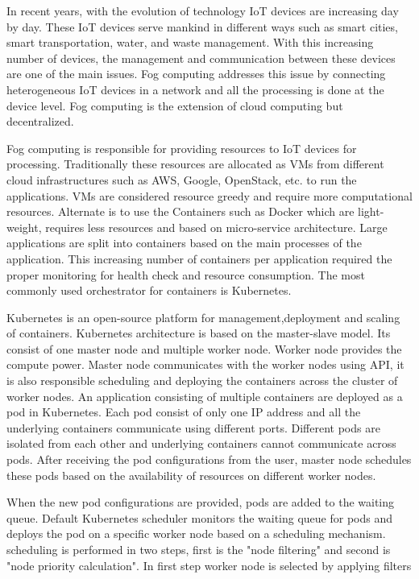 \documentclass[12pt,twoside,doublepage]{article}
\begin{document}
In recent years, with the evolution of technology IoT devices are increasing day
by day. These IoT devices serve mankind in different ways such as smart cities,
smart transportation, water, and waste management. With this increasing number of devices,
the management and communication between these devices are one of the main issues. Fog computing
addresses this issue by connecting heterogeneous IoT devices in a network and all the processing
is done at the device level. Fog computing is the extension of cloud computing but decentralized.
\par
Fog computing is responsible for providing resources to IoT devices for processing. Traditionally
these resources are allocated as VMs from different cloud infrastructures such as AWS, Google,
OpenStack, etc. to run the applications. VMs are considered resource greedy
and require more computational resources. Alternate is to use the Containers such as Docker
which are light-weight, requires less resources and based on micro-service architecture.
Large applications are split into containers based on the main processes of the application.
This increasing number of containers per application required the proper monitoring for health check
and resource consumption. The most commonly used orchestrator for containers is Kubernetes.
\par
Kubernetes is an open-source platform for management,deployment and scaling of containers.
Kubernetes architecture is based on the master-slave model. Its consist of one master node and
multiple worker node. Worker node provides the compute power. Master node communicates
with the worker nodes using API, it is also responsible scheduling and deploying the containers
across the cluster of worker nodes. An application consisting of multiple containers are deployed
as a pod in Kubernetes. Each pod consist of only one IP address and all the underlying containers
communicate using different ports. Different pods are isolated from each other and underlying
containers cannot communicate across pods. After receiving the pod configurations from the user, master node
schedules these pods based on the availability of resources on different worker nodes.
\par
When the new pod configurations are provided, pods are added to the waiting queue. Default Kubernetes
scheduler monitors the waiting queue for pods and deploys the pod on a specific worker node based on
a scheduling mechanism. scheduling is performed in two steps, first is the "node filtering" and
second is "node priority calculation". In first step worker node is selected by applying filters \cite{k8s}
\end{document}
